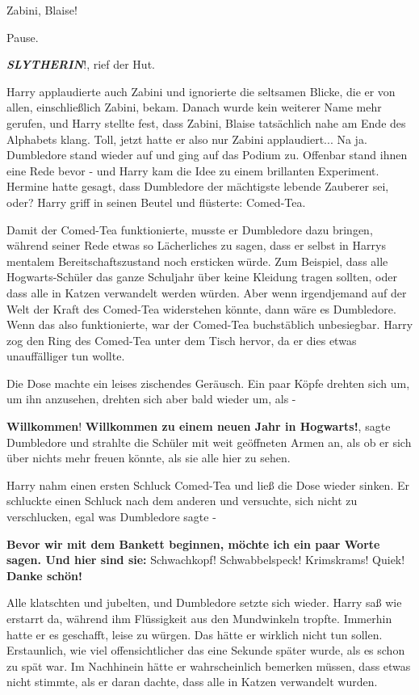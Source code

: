 \glqq Zabini, Blaise!\grqq{}

Pause.

\glqq \textbf{\emph{SLYTHERIN}}!\grqq{}, rief der Hut.

Harry applaudierte auch Zabini und ignorierte die seltsamen Blicke, die er von
allen, einschließlich Zabini, bekam. Danach wurde kein weiterer Name mehr
gerufen, und Harry stellte fest, dass \glqq Zabini, Blaise\grqq{} tatsächlich
nahe am Ende des Alphabets klang. Toll, jetzt hatte er also nur Zabini
applaudiert... Na ja. Dumbledore stand wieder auf und ging auf das Podium zu.
Offenbar stand ihnen eine Rede bevor - und Harry kam die Idee zu einem
brillanten Experiment. Hermine hatte gesagt, dass Dumbledore der mächtigste
lebende Zauberer sei, oder? Harry griff in seinen Beutel und flüsterte: \glqq
Comed-Tea\grqq{}.

Damit der Comed-Tea funktionierte, musste er Dumbledore dazu bringen, während
seiner Rede etwas so Lächerliches zu sagen, dass er selbst in Harrys mentalem
Bereitschaftszustand noch ersticken würde. Zum Beispiel, dass alle
Hogwarts-Schüler das ganze Schuljahr über keine Kleidung tragen sollten, oder
dass alle in Katzen verwandelt werden würden. Aber wenn irgendjemand auf der
Welt der Kraft des Comed-Tea widerstehen könnte, dann wäre es Dumbledore. Wenn
das also funktionierte, war der Comed-Tea buchstäblich unbesiegbar. Harry zog
den Ring des Comed-Tea unter dem Tisch hervor, da er dies etwas unauffälliger
tun wollte.

Die Dose machte ein leises zischendes Geräusch. Ein paar Köpfe drehten sich um,
um ihn anzusehen, drehten sich aber bald wieder um, als -

\glqq \textbf{Willkommen}! \textbf{Willkommen zu einem neuen Jahr in
Hogwarts!}\grqq{}, sagte Dumbledore und strahlte die Schüler mit weit geöffneten
Armen an, als ob er sich über nichts mehr freuen könnte, als sie alle hier zu
sehen.

Harry nahm einen ersten Schluck Comed-Tea und ließ die Dose wieder sinken. Er
schluckte einen Schluck nach dem anderen und versuchte, sich nicht zu
verschlucken, egal was Dumbledore sagte -

\textbf{\glqq Bevor wir mit dem Bankett beginnen, möchte ich ein paar Worte
sagen. Und hier sind sie: }Schwachkopf! Schwabbelspeck! Krimskrams! Quiek!
\textbf{Danke schön!\grqq{} }

Alle klatschten und jubelten, und Dumbledore setzte sich wieder. Harry saß wie
erstarrt da, während ihm Flüssigkeit aus den Mundwinkeln tropfte. Immerhin hatte
er es geschafft, leise zu würgen. Das hätte er wirklich nicht tun sollen.
Erstaunlich, wie viel offensichtlicher das eine Sekunde später wurde, als es
schon zu spät war. Im Nachhinein hätte er wahrscheinlich bemerken müssen, dass
etwas nicht stimmte, als er daran dachte, dass alle in Katzen verwandelt wurden.

